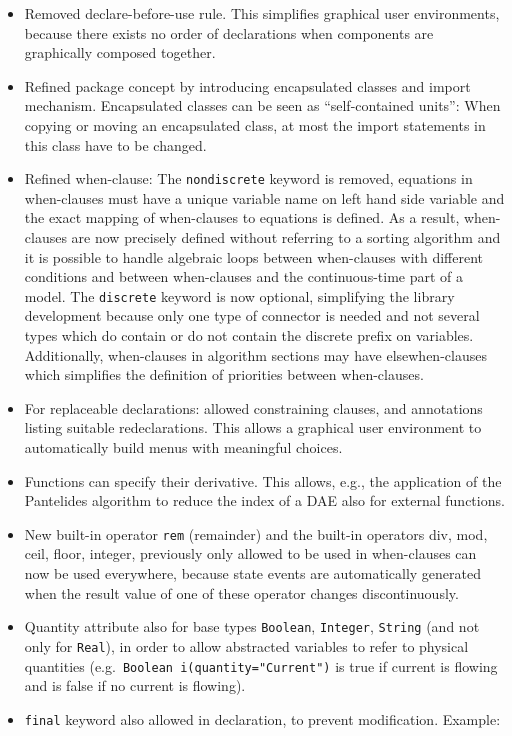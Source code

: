 \begin{itemize}
\item
  Removed declare-before-use rule. This simplifies graphical user
  environments, because there exists no order of declarations when
  components are graphically composed together.
\item
  Refined package concept by introducing encapsulated classes and import
  mechanism. Encapsulated classes can be seen as ``self-contained units'':
  When copying or moving an encapsulated class, at most the import
  statements in this class have to be changed.
\item
  Refined when-clause: The \lstinline!nondiscrete! keyword is removed, equations in when-clauses must have a unique variable name on left hand side variable and the exact mapping of when-clauses to equations is defined.  As a result, when-clauses are now precisely defined without referring to a sorting algorithm and it is possible to handle algebraic loops between when-clauses with different conditions and between when-clauses and the continuous-time part of a model.  The \lstinline!discrete! keyword is now optional, simplifying the library development because only one type of connector is needed and not several types which do contain or do not contain the discrete prefix on variables.  Additionally, when-clauses in algorithm sections may have elsewhen-clauses which simplifies the definition of priorities between when-clauses.
\item
  For replaceable declarations: allowed constraining clauses, and
  annotations listing suitable redeclarations. This allows a graphical
  user environment to automatically build menus with meaningful choices.
\item
  Functions can specify their derivative. This allows, e.g., the
  application of the Pantelides algorithm to reduce the index of a DAE
  also for external functions.
\item
  New built-in operator \lstinline!rem! (remainder) and the built-in operators
  div, mod, ceil, floor, integer, previously only allowed to be used in
  when-clauses can now be used everywhere, because state events are
  automatically generated when the result value of one of these operator
  changes discontinuously.
\item
  Quantity attribute also for base types \lstinline!Boolean!, \lstinline!Integer!, \lstinline!String! (and not only for \lstinline!Real!), in order to allow abstracted variables to refer to physical quantities (e.g.\ \lstinline!Boolean i(quantity="Current")! is true if current is flowing and is false if no current is flowing).
\item
  \lstinline!final! keyword also allowed in declaration, to prevent modification.
  Example:
\end{itemize}

